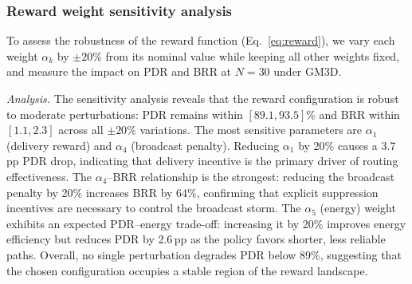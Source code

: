 \documentclass[5p,times]{elsarticle}
\begin{document}
\subsubsection{Reward weight sensitivity analysis}
\label{subsec:sensitivity}

To assess the robustness of the reward function (Eq.~\eqref{eq:reward}), we vary each weight $\alpha_k$ by $\pm 20\%$ from its nominal value while keeping all other weights fixed, and measure the impact on PDR and BRR at $N=30$ under GM3D.

\begin{table}[t]
\centering
\caption{Sensitivity of PDR (\%) and BRR to $\pm 20\%$ perturbation of each reward weight at $N=30$ under GM3D.}
\label{tab:sensitivity}
\scriptsize
\setlength{\tabcolsep}{3pt}
\end{table}

\textit{Analysis.} The sensitivity analysis reveals that the reward configuration is robust to moderate perturbations: PDR remains within $[89.1, 93.5]\%$ and BRR within $[1.1, 2.3]$ across all $\pm 20\%$ variations. The most sensitive parameters are $\alpha_1$ (delivery reward) and $\alpha_4$ (broadcast penalty). Reducing $\alpha_1$ by 20\% causes a 3.7\,pp PDR drop, indicating that delivery incentive is the primary driver of routing effectiveness. The $\alpha_4$--BRR relationship is the strongest: reducing the broadcast penalty by 20\% increases BRR by 64\%, confirming that explicit suppression incentives are necessary to control the broadcast storm. The $\alpha_5$ (energy) weight exhibits an expected PDR--energy trade-off: increasing it by 20\% improves energy efficiency but reduces PDR by 2.6\,pp as the policy favors shorter, less reliable paths. Overall, no single perturbation degrades PDR below 89\%, suggesting that the chosen configuration occupies a stable region of the reward landscape.
\end{document}
